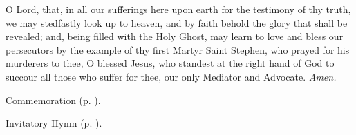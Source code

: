 \collect\label{StephenCollect}
 O Lord, that, in all our sufferings here upon earth for the testimony of thy truth, we may stedfastly look up to heaven, and by faith behold the glory that shall be revealed; and, being filled with the Holy Ghost, may learn to love and bless our persecutors by the example of thy first Martyr Saint Stephen, who prayed for his murderers to thee, O blessed Jesus, who standest at the right hand of God to succour all those who suffer for thee, our only Mediator and Advocate. \textit{Amen.}

\begin{rubric}
    Commemoration  (p. \pageref{ChristmasCollect}).
\end{rubric}


\clearpage
{}

\label{SaintJohn}


\mattins

\begin{rubric}
	Invitatory Hymn  (p. \pageref{ApostlesInvitatory}).
\end{rubric}


\mattinsOfficeHymn\label{JohnMattinsHymn}

